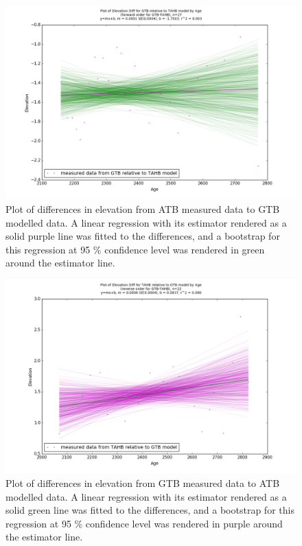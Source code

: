 \newpage

\begin{figure}[H]
	\includegraphics[width=1.3\linewidth, angle=270 ]{data/bothNonZero/withinSeventyFivePercent/gias/theGIA_GTB_relative_to_TAHB.png}
	\caption{Plot of differences in elevation from ATB measured data to GTB modelled data. A linear regression with its estimator rendered as
	 a solid purple line was fitted to the differences, and a bootstrap for this regression at 95 \% confidence level was rendered in green
	 around the estimator line.}
	\label{fig:gias_GTBxTAHB}
\end{figure}
\newpage


\begin{figure}[H]
	\includegraphics[width=1.3\linewidth, angle=270 ]{data/bothNonZero/withinSeventyFivePercent/gias/theGIA_TAHB_relative_to_GTB.png}
	\caption{Plot of differences in elevation from GTB measured data to ATB modelled data. A linear regression with its estimator rendered as
	 a solid green line was fitted to the differences, and a bootstrap for this regression at 95 \% confidence level was rendered in purple
	 around the estimator line.}
	\label{fig:gias_TAHBxGTB}
\end{figure}
\newpage

